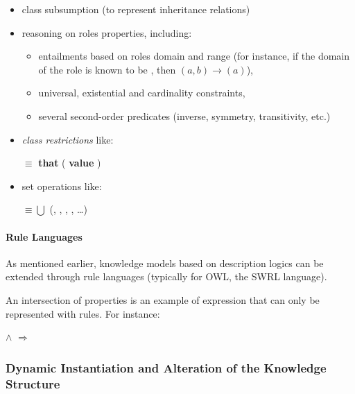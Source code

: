 \begin{itemize}
    \item class subsumption (to represent inheritance relations)

    \item reasoning on roles properties, including:
        \begin{itemize}
        \item entailments based on roles domain and range (for instance, if the
        domain of the role  is known to be
        , then $(a, b) \to
        $$(a)$),

        \item universal, existential and cardinality constraints,

        \item several second-order predicates (inverse, symmetry, transitivity, etc.)

        \end{itemize}

    \item \emph{class restrictions} like: \par 
    \footnotesize 
     $\equiv$  {\bf that} (
    {\bf value} )
    \normalsize

    \item set operations like: \par 
    \footnotesize 
     $\equiv \bigcup$ (, ,
    , , \ldots) 
    \normalsize

\end{itemize}

\paragraph{Rule Languages} As mentioned earlier, knowledge models based on
description logics can be extended through rule languages (typically for OWL,
the SWRL language).

An intersection of properties is an example of expression that can only be
represented with rules. For instance:

\footnotesize
{} $\land$ 
$\Rightarrow$ 
\normalsize

\subsubsection{Dynamic Instantiation and Alteration of the Knowledge Structure}

